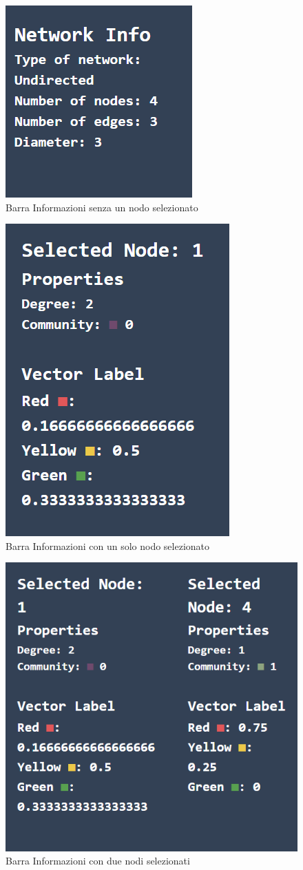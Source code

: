 \documentclass[a4paper,12pt]{report}
\begin{document}
\begin{itemize}
			\begin{center}
				\begin{figure}[H]
				\centering
				\includegraphics[width=0.4\linewidth]{infobargeneral}
				\caption{Barra Informazioni senza un nodo selezionato}
				\end{figure}
				\begin{figure}[H]
				\centering
				\includegraphics[width=0.4\linewidth]{infobar1}
				\caption{Barra Informazioni con un solo nodo selezionato}
				\end{figure}
				\begin{figure}[H]
				\centering
				\includegraphics[width=0.6\linewidth]{infobar2}
				\caption{Barra Informazioni con due nodi selezionati}
				\end{figure}
			\end{center}
			\end{itemize}
			
\end{document}
